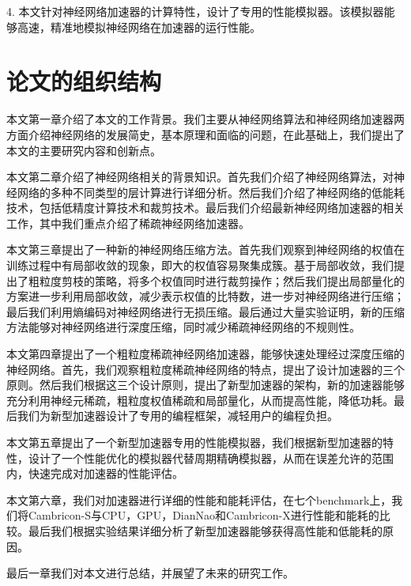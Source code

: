4. 本文针对神经网络加速器的计算特性，设计了专用的性能模拟器。该模拟器能够高速，精准地模拟神经网络在加速器的运行性能。

\section{论文的组织结构}
本文第一章介绍了本文的工作背景。我们主要从神经网络算法和神经网络加速器两方面介绍神经网络的发展简史，基本原理和面临的问题，在此基础上，我们提出了本文的主要研究内容和创新点。

本文第二章介绍了神经网络相关的背景知识。首先我们介绍了神经网络算法，对神经网络的多种不同类型的层计算进行详细分析。然后我们介绍了神经网络的低能耗技术，包括低精度计算技术和裁剪技术。最后我们介绍最新神经网络加速器的相关工作，其中我们重点介绍了稀疏神经网络加速器。

本文第三章提出了一种新的神经网络压缩方法。首先我们观察到神经网络的权值在训练过程中有局部收敛的现象，即大的权值容易聚集成簇。基于局部收敛，我们提出了粗粒度剪枝的策略，将多个权值同时进行裁剪操作；然后我们提出局部量化的方案进一步利用局部收敛，减少表示权值的比特数，进一步对神经网络进行压缩；最后我们利用熵编码对神经网络进行无损压缩。最后通过大量实验证明，新的压缩方法能够对神经网络进行深度压缩，同时减少稀疏神经网络的不规则性。

本文第四章提出了一个粗粒度稀疏神经网络加速器，能够快速处理经过深度压缩的神经网络。首先，我们观察粗粒度稀疏神经网络的特点，提出了设计加速器的三个原则。然后我们根据这三个设计原则，提出了新型加速器的架构，新的加速器能够充分利用神经元稀疏，粗粒度权值稀疏和局部量化，从而提高性能，降低功耗。最后我们为新型加速器设计了专用的编程框架，减轻用户的编程负担。

本文第五章提出了一个新型加速器专用的性能模拟器，我们根据新型加速器的特性，设计了一个性能优化的模拟器代替周期精确模拟器，从而在误差允许的范围内，快速完成对加速器的性能评估。

本文第六章，我们对加速器进行详细的性能和能耗评估，在七个benchmark上，我们将Cambricon-S与CPU，GPU，DianNao和Cambricon-X进行性能和能耗的比较。最后我们根据实验结果详细分析了新型加速器能够获得高性能和低能耗的原因。

最后一章我们对本文进行总结，并展望了未来的研究工作。
